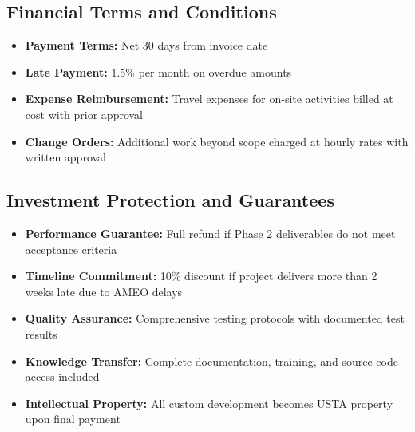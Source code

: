 \subsection{Financial Terms and Conditions}
\begin{itemize}
    \item \textbf{Payment Terms:} Net 30 days from invoice date
    \item \textbf{Late Payment:} 1.5\% per month on overdue amounts
    \item \textbf{Expense Reimbursement:} Travel expenses for on-site activities billed at cost with prior approval
    \item \textbf{Change Orders:} Additional work beyond scope charged at hourly rates with written approval
\end{itemize}

\subsection{Investment Protection and Guarantees}
\begin{itemize}
    \item \textbf{Performance Guarantee:} Full refund if Phase 2 deliverables do not meet acceptance criteria
    \item \textbf{Timeline Commitment:} 10\% discount if project delivers more than 2 weeks late due to AMEO delays
    \item \textbf{Quality Assurance:} Comprehensive testing protocols with documented test results
    \item \textbf{Knowledge Transfer:} Complete documentation, training, and source code access included
    \item \textbf{Intellectual Property:} All custom development becomes USTA property upon final payment
\end{itemize}
